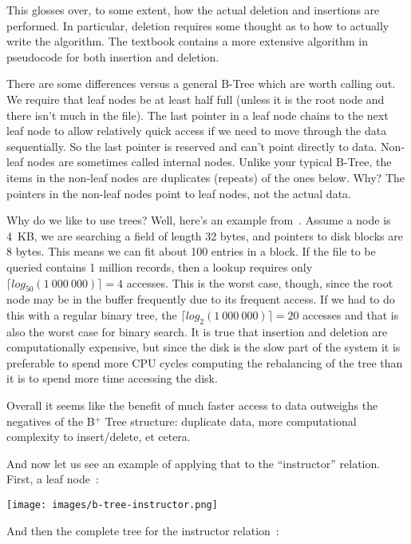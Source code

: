 This glosses over, to some extent, how the actual deletion and insertions are performed. In particular, deletion requires some thought as to how to actually write the algorithm. The textbook contains a more extensive algorithm in pseudocode for both insertion and deletion.

There are some differences versus a general B-Tree which are worth calling out. We require that leaf nodes be at least half full (unless it is the root node and there isn't much in the file). The last pointer in a leaf node chains to the next leaf node to allow relatively quick access if we need to move through the data sequentially. So the last pointer is reserved and can't point directly to data. Non-leaf nodes are sometimes called internal nodes. Unlike your typical B-Tree, the items in the non-leaf nodes are duplicates (repeats) of the ones below. Why? The pointers in the non-leaf nodes point to leaf nodes, not the actual data.

Why do we like to use trees? Well, here's an example from~\cite{dsc}. Assume a node is 4~KB, we are searching a field of length 32 bytes, and pointers to disk blocks are 8 bytes. This means we can fit about 100 entries in a block. If the file to be queried contains 1 million records, then a lookup requires only $\lceil log_{50}(1~000~000) \rceil = 4$ accesses. This is the worst case, though, since the root node may be in the buffer frequently due to its frequent access. If we had to do this with a regular binary tree, the $\lceil log_{2}(1~000~000) \rceil = 20$ accesses and that is also the worst case for binary search. It is true that insertion and deletion are computationally expensive, but since the disk is the slow part of the system it is preferable to spend more CPU cycles computing the rebalancing of the tree than it is to spend more time accessing the disk. 

Overall it seems like the benefit of much faster access to data outweighs the negatives of the B$^{+}$ Tree structure: duplicate data, more computational complexity to insert/delete, et cetera.

And now let us see an example of applying that to the ``instructor'' relation. First, a leaf node~\cite{dsc}:

\begin{center}
	\texttt{[image: images/b-tree-instructor.png]}
\end{center}

And then the complete tree for the instructor relation~\cite{dsc}:

